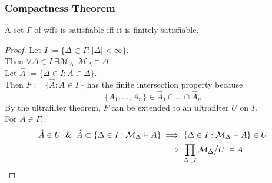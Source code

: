 \documentclass[UTF8,aspectratio=43,11pt,colorlinks,compress,openany]{beamer}%
\begin{document}
\begin{frame}\frametitle{Compactness Theorem}
\setlength\abovedisplayskip{0pt}
\setlength\belowdisplayskip{0pt}
	\begin{corollary}
		A set $\Gamma$ of wffs is satisfiable iff it is finitely satisfiable.
	\end{corollary}
	\begin{proof}
		Let $I:=\big\{\Delta\subset\Gamma: |\Delta|<\infty\big\}$.\\
		Then $\forall \Delta\in I\;\exists \mathcal{M}_\Delta: \mathcal{M}_\Delta\vDash\Delta$.\\
		Let $\hat{A}:=\{\Delta\in I: A\in\Delta\}$.\\
		Then $F:=\{\hat{A}: A\in\Gamma\}$ has the finite intersection property because
		\[\{A_1,\dots, A_n\}\in\hat{A}_1\cap\dots\cap\hat{A}_n\]
		By the ultrafilter theorem, $F$ can be extended to an ultrafilter $U$ on $I$.\\
		For $A\in\Gamma$,
		\begin{align*}
		\hat{A}\in U\;\;\&\;\;\hat{A}\subset\{\Delta\in I:\mathcal{M}_\Delta\vDash A\}&\implies\{\Delta\in I:\mathcal{M}_\Delta\vDash A\}\in U\\
		&\implies\prod\limits_{\Delta\in I}\mathcal{M}_\Delta\big\slash U\;\vDash A
		\end{align*}
	\end{proof}
\end{frame}
\end{document}
